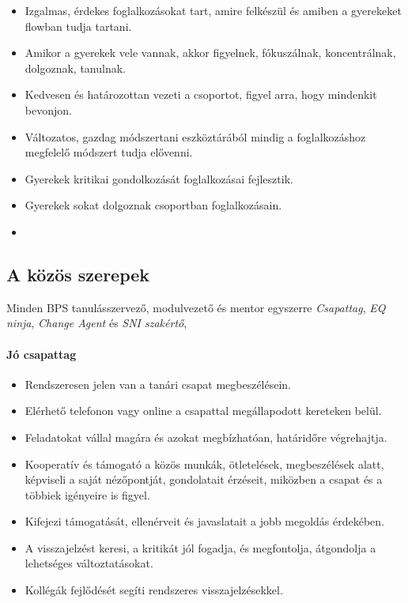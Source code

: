 \begin{itemize}

  \item
        Izgalmas, érdekes foglalkozásokat tart, amire felkészül és amiben a
        gyerekeket flowban tudja tartani.
  \item
        Amikor a gyerekek vele vannak, akkor figyelnek, fókuszálnak,
        koncentrálnak, dolgoznak, tanulnak.
  \item
        Kedvesen és határozottan vezeti a csoportot, figyel arra, hogy
        mindenkit bevonjon.
  \item Változatos, gazdag módszertani eszköztárából mindig a foglalkozáshoz
        megfelelő módszert tudja elővenni.
  \item  Gyerekek kritikai gondolkozását foglalkozásai fejlesztik.
  \item Gyerekek sokat dolgoznak csoportban foglalkozásain.
  \item
\end{itemize}


\subsection{A közös szerepek}

Minden BPS tanulásszervező, modulvezető és mentor egyszerre  \emph{Csapattag}, \emph{EQ ninja}, \emph{Change Agent} és \emph{SNI szakértő}, 

\paragraph{Jó csapattag}

\begin{itemize}

  \item
        Rendszeresen jelen van a tanári csapat megbeszélésein.
  \item
        Elérhető telefonon vagy online a csapattal megállapodott kereteken
        belül.
  \item
        Feladatokat vállal magára és azokat megbízhatóan, határidőre
        végrehajtja.
  \item
        Kooperatív és támogató a közös munkák, ötletelések, megbeszélések
        alatt, képviseli a saját nézőpontját, gondolatait érzéseit, miközben a
        csapat és a többiek igényeire is figyel.
  \item
        Kifejezi támogatását, ellenérveit és javaslatait a jobb megoldás
        érdekében.
  \item
        A visszajelzést keresi, a kritikát jól fogadja, és megfontolja,
        átgondolja a lehetséges változtatásokat.
  \item
        Kollégák fejlődését segíti rendszeres visszajelzésekkel.
\end{itemize}

